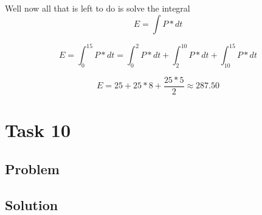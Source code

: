 \documentclass[a4paper, 10pt]{article}
\begin{document}
\begin{enumerate}
					\noindent Well now all that is left to do is solve the integral 
					\[E = \int P * dt\]
					
					\begin{equation}
						E = \int_{0}^{15}P*dt = \int_{0}^{2}P*dt + \int_{2}^{10}P*dt + \int_{10}^{15}P*dt
					\end{equation}
				
					\begin{equation}
						E = 25 + 25*8 + \frac{25 * 5}{2} \approx  287.50
					\end{equation}
			\end{enumerate}
	\section{Task 10}
	
		\subsection{Problem}
		
		\subsection{Solution}
\end{document}
